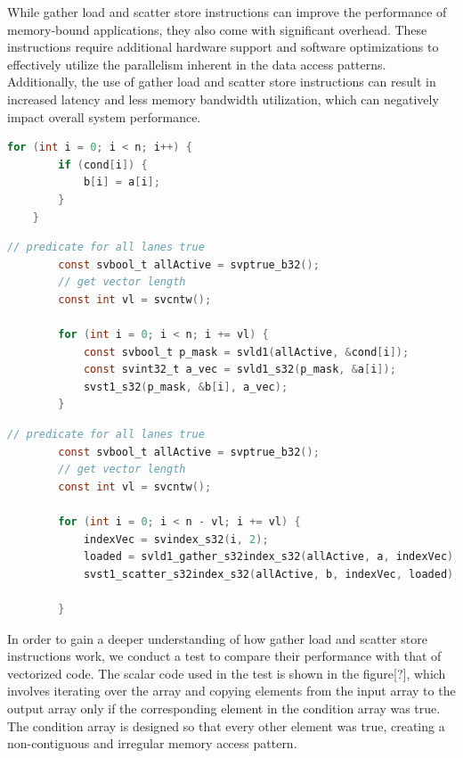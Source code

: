 \documentclass[\main/thesis.tex]{subfiles}
\begin{document}
While gather load and scatter store instructions can improve the performance of memory-bound applications, they also come with significant overhead. These instructions require additional hardware support and software optimizations to effectively utilize the parallelism inherent in the data access patterns. Additionally, the use of gather load and scatter store instructions can result in increased latency and less memory bandwidth utilization, which can negatively impact overall system performance.

\newpage

\begin{lstlisting}[language=C, caption=Scalar Code]
    for (int i = 0; i < n; i++) {
        if (cond[i]) {
            b[i] = a[i];
        }
    }
    \end{lstlisting}
    
    \begin{lstlisting}[language=C,caption=Vectorized Code]
        // predicate for all lanes true
        const svbool_t allActive = svptrue_b32(); 
        // get vector length
        const int vl = svcntw(); 
    
        for (int i = 0; i < n; i += vl) {
            const svbool_t p_mask = svld1(allActive, &cond[i]); 
            const svint32_t a_vec = svld1_s32(p_mask, &a[i]);
            svst1_s32(p_mask, &b[i], a_vec); 
        }
    \end{lstlisting}
    
    \begin{lstlisting}[language=C,caption= Code Using Gather/Scatter]
        // predicate for all lanes true
        const svbool_t allActive = svptrue_b32(); 
        // get vector length
        const int vl = svcntw(); 

        for (int i = 0; i < n - vl; i += vl) {
            indexVec = svindex_s32(i, 2);
            loaded = svld1_gather_s32index_s32(allActive, a, indexVec);
            svst1_scatter_s32index_s32(allActive, b, indexVec, loaded);
    
        }
    \end{lstlisting}
    

\newpage

In order to gain a deeper understanding of how gather load and scatter store instructions work, we conduct a test to compare their performance with that of vectorized code. The scalar code used in the test is shown in the figure[?], which involves iterating over the array and copying elements from the input array to the output array only if the corresponding element in the condition array was true. The condition array is designed so that every other element was true, creating a non-contiguous and irregular memory access pattern.
\end{document}

